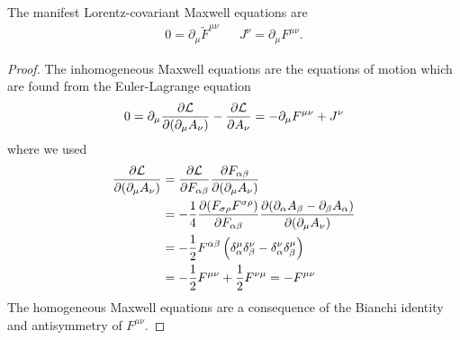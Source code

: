 \begin{theorem}
	The manifest Lorentz-covariant Maxwell equations are
	\begin{align}
		0
		=
		\partial_\mu
		\tilde{F}^{\mu\nu}
		&&
		J^\nu
		=
		\partial_\mu
		F^{\mu\nu}
		\label{eq:tensor_maxwell}.
	\end{align}
\end{theorem}
\begin{proof}
	The inhomogeneous Maxwell equations are the equations of motion which are found from the Euler-Lagrange equation
	\begin{equation*}
		0
		=
		\partial_\mu
		\pdv{\mathcal{L}}{(\partial_\mu A_\nu)}
		-
		\pdv{\mathcal{L}}{A_\nu}
		=
		-
		\partial_\mu
		F^{\mu\nu}
		+
		J^\nu
	\end{equation*}
	where we used
	\begin{equation*}
		\begin{split}
			\pdv{\mathcal{L}}{(\partial_\mu A_\nu)}
			&=
			\pdv{\mathcal{L}}{F_{\alpha\beta}}
			\pdv{F_{\alpha\beta}}{(\partial_\mu A_\nu)}
			\\
			&=
			-
			\frac{1}{4}
			\pdv{(F_{\sigma\rho}F^{\sigma\rho})}{F_{\alpha\beta}}
			\pdv{(\partial_\alpha A_\beta-\partial_\beta A_\alpha)}{(\partial_\mu A_\nu)}
			\\
			&=
			-
			\frac{1}{2}
			F^{\alpha\beta}
			\left(
				\delta_\alpha^\mu
				\delta_\beta^\nu
				-
				\delta_\alpha^\nu
				\delta_\beta^\mu
			\right)
			\\
			&=
			-
			\frac{1}{2}
			F^{\mu\nu}
			+
			\frac{1}{2}
			F^{\nu\mu}
			=
			-
			F^{\mu\nu}			
		\end{split}
	\end{equation*}
	The homogeneous Maxwell equations are a consequence of the Bianchi identity and antisymmetry of $F^{\mu\nu}$.
\end{proof}

